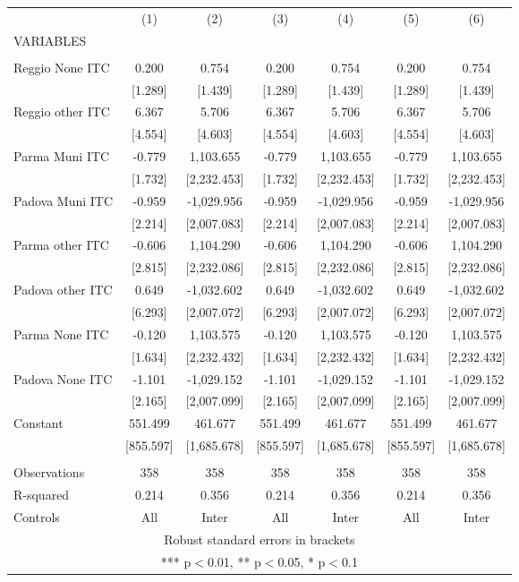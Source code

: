 \begin{tabular}{lcccccc} \hline
 & (1) & (2) & (3) & (4) & (5) & (6) \\
VARIABLES &  &  &  &  &  &  \\ \hline
 &  &  &  &  &  &  \\
Reggio None ITC & 0.200 & 0.754 & 0.200 & 0.754 & 0.200 & 0.754 \\
 & [1.289] & [1.439] & [1.289] & [1.439] & [1.289] & [1.439] \\
Reggio other ITC & 6.367 & 5.706 & 6.367 & 5.706 & 6.367 & 5.706 \\
 & [4.554] & [4.603] & [4.554] & [4.603] & [4.554] & [4.603] \\
Parma Muni ITC & -0.779 & 1,103.655 & -0.779 & 1,103.655 & -0.779 & 1,103.655 \\
 & [1.732] & [2,232.453] & [1.732] & [2,232.453] & [1.732] & [2,232.453] \\
Padova Muni ITC & -0.959 & -1,029.956 & -0.959 & -1,029.956 & -0.959 & -1,029.956 \\
 & [2.214] & [2,007.083] & [2.214] & [2,007.083] & [2.214] & [2,007.083] \\
Parma other ITC & -0.606 & 1,104.290 & -0.606 & 1,104.290 & -0.606 & 1,104.290 \\
 & [2.815] & [2,232.086] & [2.815] & [2,232.086] & [2.815] & [2,232.086] \\
Padova other ITC & 0.649 & -1,032.602 & 0.649 & -1,032.602 & 0.649 & -1,032.602 \\
 & [6.293] & [2,007.072] & [6.293] & [2,007.072] & [6.293] & [2,007.072] \\
Parma None ITC & -0.120 & 1,103.575 & -0.120 & 1,103.575 & -0.120 & 1,103.575 \\
 & [1.634] & [2,232.432] & [1.634] & [2,232.432] & [1.634] & [2,232.432] \\
Padova None ITC & -1.101 & -1,029.152 & -1.101 & -1,029.152 & -1.101 & -1,029.152 \\
 & [2.165] & [2,007.099] & [2.165] & [2,007.099] & [2.165] & [2,007.099] \\
Constant & 551.499 & 461.677 & 551.499 & 461.677 & 551.499 & 461.677 \\
 & [855.597] & [1,685.678] & [855.597] & [1,685.678] & [855.597] & [1,685.678] \\
 &  &  &  &  &  &  \\
Observations & 358 & 358 & 358 & 358 & 358 & 358 \\
R-squared & 0.214 & 0.356 & 0.214 & 0.356 & 0.214 & 0.356 \\
 Controls & All & Inter & All & Inter & All & Inter \\ \hline
\multicolumn{7}{c}{ Robust standard errors in brackets} \\
\multicolumn{7}{c}{ *** p$<$0.01, ** p$<$0.05, * p$<$0.1} \\
\end{tabular}
